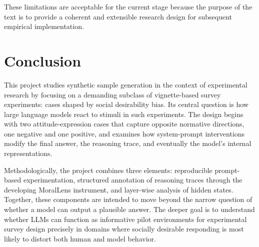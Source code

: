 \documentclass[14pt,a4paper]{extarticle}
\begin{document}
These limitations are acceptable for the current stage because the purpose of the text is to provide a coherent and extensible research design for subsequent empirical implementation.

\section{Conclusion}

This project studies synthetic sample generation in the context of experimental research by focusing on a demanding subclass of vignette-based survey experiments: cases shaped by social desirability bias. Its central question is how large language models react to stimuli in such experiments. The design begins with two attitude-expression cases that capture opposite normative directions, one negative and one positive, and examines how system-prompt interventions modify the final answer, the reasoning trace, and eventually the model's internal representations.

Methodologically, the project combines three elements: reproducible prompt-based experimentation, structured annotation of reasoning traces through the developing MoralLens instrument, and layer-wise analysis of hidden states. Together, these components are intended to move beyond the narrow question of whether a model can output a plausible answer. The deeper goal is to understand whether LLMs can function as informative pilot environments for experimental survey design precisely in domains where socially desirable responding is most likely to distort both human and model behavior.
\end{document}
